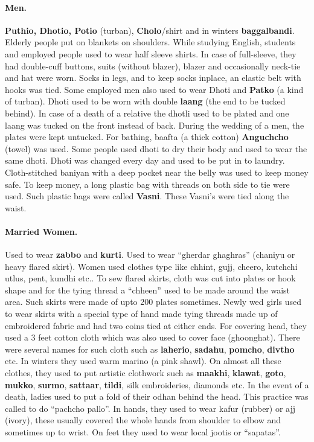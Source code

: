 \paragraph{Men.} \textbf{Puthio, Dhotio, Potio} (turban), \textbf{Cholo}/shirt
and in winters \textbf{baggalbandi}. Elderly people put on blankets on
shoulders. While studying English, students and employed people used to wear
half sleeve shirts. In case of full-sleeve, they had double-cuff buttons, suits
(without blazer), blazer and occasionally neck-tie and hat were worn. Socks in
legs, and to keep socks inplace, an elastic belt with hooks was tied. Some
employed men also used to wear Dhoti and \textbf{Patko} (a kind of turban).
Dhoti used to be worn with double \textbf{laang} (the end to be tucked behind).
In case of a death of a relative the dhotli used to be plated and one laang was
tucked on the front instead of back. During the wedding of a men, the plates
were kept untucked.
For bathing, baafta (a thick cotton) \textbf{Anguchcho} (towel) was used. Some
people used dhoti to dry their body and used to wear the same dhoti. Dhoti was
changed every day and used to be put in to laundry. Cloth-stitched baniyan with
a deep pocket near the belly was used to keep money safe. To keep money, a long
plastic bag with threads on both side to tie were used. Such plastic bags were
called \textbf{Vasni}. These Vasni's were tied along the waist.
\paragraph{Married Women.} Used to wear \textbf{zabbo} and \textbf{kurti}. Used
to wear ``gherdar ghaghras'' (chaniyu or heavy flared skirt). Women used clothes
type like chhint, gujj, cheero, kutchchi utlus, pent, kundhi etc.. To sew flared
skirts, cloth was cut into plates or hook shape and for the tying thread a
``chheen'' used to be made around the waist area. Such skirts were made of upto
200 plates sometimes. Newly wed girls used to wear skirts with a special type of
hand made tying threads made up of embroidered fabric and had two coins tied at
either ends. For covering head, they used a 3 feet cotton cloth which was also
used to cover face (ghoonghat). There were several names for such cloth such as
\textbf{laherio}, \textbf{sadahu}, \textbf{pomcho}, \textbf{divtho} etc. In
winters they used warm marino (a pink shawl). On almost all these clothes, they
used to put artistic clothwork such as \textbf{maakhi}, \textbf{klawat},
\textbf{goto}, \textbf{mukko}, \textbf{surmo}, \textbf{sattaar}, \textbf{tildi},
silk embroideries, diamonds etc. In the event of a death, ladies used to put a
fold of their odhan behind the head. This practice was called to do ``pachcho
pallo''. In hands, they used to wear kafur (rubber) or ajj (ivory), these
usually covered the whole hands from shoulder to elbow and sometimes up to wrist.
On feet they used to wear local jootis or ``sapatas''.


